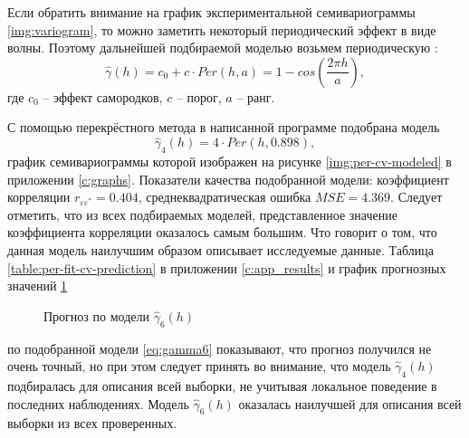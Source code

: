 Если обратить внимание на график экспериментальной семивариограммы \ref{img:variogram}, то можно заметить некоторый периодический эффект в виде волны. Поэтому дальнейшей подбираемой моделью возьмем периодическую \cite{pebesma2001gstat}:
\begin{equation}
\label{eq:per}
	\widehat{\gamma}(h) = c_0 + c \cdot Per(h, a) = 1 - cos(\frac{2 \pi h}{a}),
\end{equation}
где $ c_0 $ -- эффект самородков, $ c $ -- порог, $ a $ -- ранг.

С помощью перекрёстного метода в написанной программе подобрана модель
\begin{equation}
\label{eq:gamma6}
	\widehat{\gamma}_4(h) = 4 \cdot Per(h, 0.898),
\end{equation}
график семивариограммы которой изображен на рисунке \ref{img:per-cv-modeled} в приложении \ref{c:graphs}. Показатели качества подобранной модели: коэффициент корреляции $ r_{\varepsilon\varepsilon^{*}} = 0.404 $, среднеквадратическая ошибка $ MSE = 4.369 $. Следует отметить, что из всех подбираемых моделей, представленное значение коэффициента корреляции оказалось самым большим. Что говорит о том, что данная модель наилучшим образом описывает исследуемые данные. Таблица \ref{table:per-fit-cv-prediction} в приложении \ref{c:app_results} и график прогнозных значений \ref{img:per-cv-pred}
\begin{figure}[ht]
\caption{Прогноз по модели $ \widehat{\gamma}_6(h) $}
\label{img:per-cv-pred}
\end{figure}
по подобранной модели \eqref{eq:gamma6} показывают, что прогноз получился не очень точный, но при этом следует принять во внимание, что модель $ \widehat{\gamma}_4(h) $ подбиралась для описания всей выборки, не учитывая локальное поведение в последних наблюдениях. Модель $ \widehat{\gamma}_6(h) $ оказалась наилучшей для описания всей выборки из всех проверенных.

